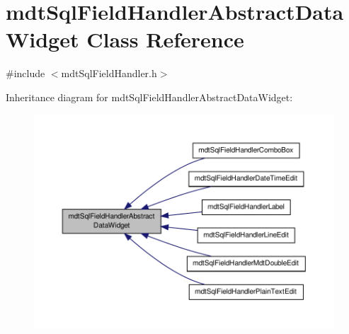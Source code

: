 \hypertarget{classmdt_sql_field_handler_abstract_data_widget}{\section{mdt\-Sql\-Field\-Handler\-Abstract\-Data\-Widget Class Reference}
\label{classmdt_sql_field_handler_abstract_data_widget}
}


{\ttfamily \#include $<$mdt\-Sql\-Field\-Handler.\-h$>$}



Inheritance diagram for mdt\-Sql\-Field\-Handler\-Abstract\-Data\-Widget\-:
\nopagebreak
\begin{figure}[H]
\begin{center}
\leavevmode
\includegraphics[width=350pt]{classmdt_sql_field_handler_abstract_data_widget__inherit__graph}
\end{center}
\end{figure}

